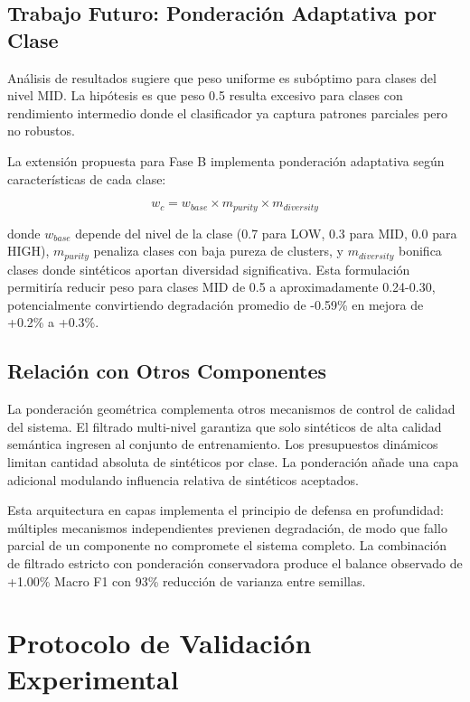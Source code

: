 \subsection{Trabajo Futuro: Ponderación Adaptativa por Clase}
\label{subsec:trabajo_futuro_peso}

Análisis de resultados sugiere que peso uniforme es subóptimo para clases del nivel MID. La hipótesis es que peso 0.5 resulta excesivo para clases con rendimiento intermedio donde el clasificador ya captura patrones parciales pero no robustos.

La extensión propuesta para Fase B implementa ponderación adaptativa según características de cada clase:

\begin{equation}
w_c = w_{base} \times m_{purity} \times m_{diversity}
\end{equation}

donde $w_{base}$ depende del nivel de la clase (0.7 para LOW, 0.3 para MID, 0.0 para HIGH), $m_{purity}$ penaliza clases con baja pureza de clusters, y $m_{diversity}$ bonifica clases donde sintéticos aportan diversidad significativa. Esta formulación permitiría reducir peso para clases MID de 0.5 a aproximadamente 0.24-0.30, potencialmente convirtiendo degradación promedio de -0.59\% en mejora de +0.2\% a +0.3\%.

\subsection{Relación con Otros Componentes}
\label{subsec:relacion_componentes}

La ponderación geométrica complementa otros mecanismos de control de calidad del sistema. El filtrado multi-nivel garantiza que solo sintéticos de alta calidad semántica ingresen al conjunto de entrenamiento. Los presupuestos dinámicos limitan cantidad absoluta de sintéticos por clase. La ponderación añade una capa adicional modulando influencia relativa de sintéticos aceptados.

Esta arquitectura en capas implementa el principio de defensa en profundidad: múltiples mecanismos independientes previenen degradación, de modo que fallo parcial de un componente no compromete el sistema completo. La combinación de filtrado estricto con ponderación conservadora produce el balance observado de +1.00\% Macro F1 con 93\% reducción de varianza entre semillas.

\section{Protocolo de Validación Experimental}
\label{sec:validacion}

